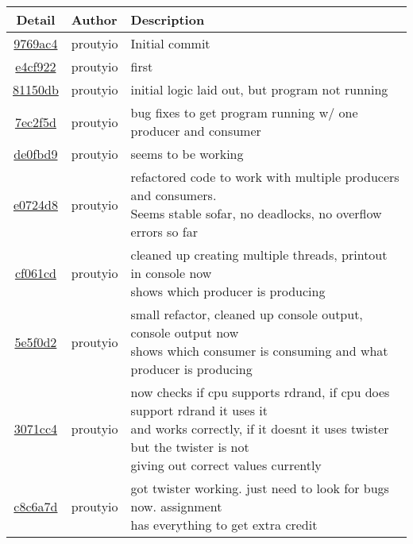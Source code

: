 \begin{tabular}{| c | l | l |}\hline\textbf{Detail} & \textbf{Author} & \textbf{Description}\\\hline
\href{https://github.com/proutyio/OSU_CS444/commit/9769ac4a40558433934646fe1fe6426f0e217689}{9769ac4} & proutyio & Initial commit\\\hline
\href{https://github.com/proutyio/OSU_CS444/commit/e4cf92298ac6089ef189aac4e6182a0f406ebb2e}{e4cf922} & proutyio & first\\\hline
\href{https://github.com/proutyio/OSU_CS444/commit/81150dbb3fa01eb2805bee6f06f491259db3668d}{81150db} & proutyio & initial logic laid out, but program not running\\\hline
\href{https://github.com/proutyio/OSU_CS444/commit/7ec2f5d1d883588ae57ebc1634dc53f1c97d62a2}{7ec2f5d} & proutyio & bug fixes to get program running w/ one producer and consumer\\\hline
\href{https://github.com/proutyio/OSU_CS444/commit/de0fbd97085100f75ee6d3072508f773e03c6984}{de0fbd9} & proutyio & seems to be working\\\hline
\href{https://github.com/proutyio/OSU_CS444/commit/e0724d83919763a8973b29e086fb1b6d6a8cd0ad}{e0724d8} & proutyio & \makecell[l]{refactored code to work with multiple producers and consumers.\\Seems stable sofar, no deadlocks, no overflow errors so far}\\\hline
\href{https://github.com/proutyio/OSU_CS444/commit/cf061cde8d3d8490caeece057124dbee4680f790}{cf061cd} & proutyio & \makecell[l]{cleaned up creating multiple threads, printout in console now\\shows which producer is producing}\\\hline
\href{https://github.com/proutyio/OSU_CS444/commit/5e5f0d222e66b635132332b9444d2c2531941208}{5e5f0d2} & proutyio & \makecell[l]{small refactor, cleaned up console output, console output now\\shows which consumer is consuming and what producer is producing}\\\hline
\href{https://github.com/proutyio/OSU_CS444/commit/3071cc4db902f25c3dd1ee6ebd7f58403d41d133}{3071cc4} & proutyio & \makecell[l]{now checks if cpu supports rdrand, if cpu does support rdrand it uses it\\and works correctly, if it doesnt it uses twister but the twister is not\\giving out correct values currently}\\\hline
\href{https://github.com/proutyio/OSU_CS444/commit/c8c6a7d61cab0f87a80aaa2ba6cd9598aac791ee}{c8c6a7d} & proutyio & \makecell[l]{got twister working. just need to look for bugs now. assignment\\has everything to get extra credit}\\\hline

\end{tabular}
